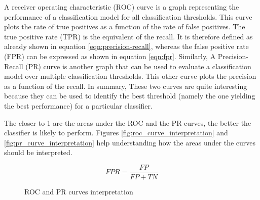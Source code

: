 \documentclass[LaM,binding=0.6cm, english]{sapthesis}
\begin{document}
A receiver operating characteristic (ROC) curve is a graph representing the performance of a classification model for all classification thresholds. This curve plots the rate of true positives as a function of the rate of false positives. The true positive rate (TPR) is the equivalent of the recall. It is therefore defined as already shown in equation \ref{eqn:precision-recall}, whereas the false positive rate (FPR) can be expressed as shown in equation \ref{eqn:fpr}. Similarly, A Precision-Recall (PR) curve is another graph that can be used to evaluate a classification model over multiple classification thresholds. This other curve plots the precision as a function of the recall. In summary, These two curves are quite interesting because they can be used to identify the best threshold (namely the one yielding the best performance) for a particular classifier.

The closer to 1 are the areas under the ROC and the PR curves, the better the classifier is likely to perform. Figures \ref{fig:roc_curve_interpretation} and \ref{fig:pr_curve_interpretation} help understanding how the areas under the curves should be interpreted.

\begin{equation}
\label{eqn:fpr}
FPR = \frac{FP}{FP + TN}
\end{equation}

\begin{figure}[h!]
  \centering
  \hfill
  \caption{ROC and PR curves interpretation}
\end{figure}
\end{document}
